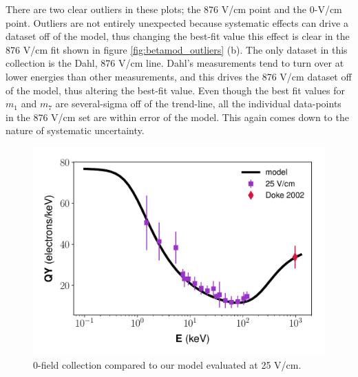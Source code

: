 There are two clear outliers in these plots; the 876 V/cm point and the 0-V/cm point. Outliers are not entirely unexpected because systematic effects can drive a dataset off of the model, thus changing the best-fit value this effect is clear in the 876 V/cm fit shown in figure \ref{fig:betamod_outliers} (b). The only dataset in this collection is the Dahl, 876 V/cm line. Dahl's measurements tend to turn over at lower energies than other measurements, and this drives the 876 V/cm dataset off of the model, thus altering the best-fit value. Even though the best fit values for $m_1$ and $m_7$ are several-sigma off of the trend-line, all the individual data-points in the 876 V/cm set are within error of the model. This again comes down to the nature of systematic uncertainty.
\begin{figure}[!h]
\centering
\includegraphics[width=\linewidth]{Figures/Yields_fit_new/NEST_fit_25Vcm_new.pdf}
\caption{0-field collection compared to our model evaluated at 25 V/cm.}
\label{fig:betamod_25Vcm}
\end{figure}

